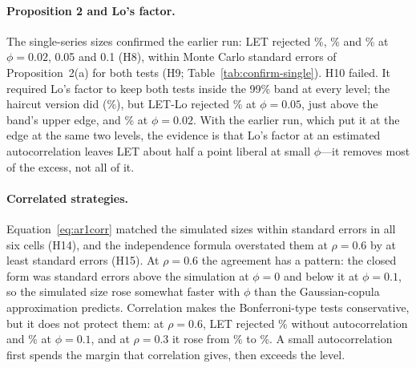 \paragraph{Proposition 2 and Lo's factor.} The single-series sizes confirmed the earlier run: LET rejected \%, \% and \% at $\phi=0.02$, 0.05 and 0.1 (H8), within  Monte Carlo standard errors of Proposition~2(a) for both tests (H9; Table~\ref{tab:confirm-single}). H10 failed. It required Lo's factor to keep both tests inside the 99\% band at every level; the haircut version did (\%), but LET-Lo rejected \% at $\phi=0.05$, just above the band's upper edge, and \% at $\phi=0.02$. With the earlier run, which put it at the edge at the same two levels, the evidence is that Lo's factor at an estimated autocorrelation leaves LET about half a point liberal at small $\phi$---it removes most of the excess, not all of it.

\paragraph{Correlated strategies.} Equation~\eqref{eq:ar1corr} matched the simulated sizes within  standard errors in all six cells (H14), and the independence formula overstated them at $\rho=0.6$ by at least  standard errors (H15). At $\rho=0.6$ the agreement has a pattern: the closed form was  standard errors above the simulation at $\phi=0$ and  below it at $\phi=0.1$, so the simulated size rose somewhat faster with $\phi$ than the Gaussian-copula approximation predicts. Correlation makes the Bonferroni-type tests conservative, but it does not protect them: at $\rho=0.6$, LET rejected \% without autocorrelation and \% at $\phi=0.1$, and at $\rho=0.3$ it rose from \% to \%. A small autocorrelation first spends the margin that correlation gives, then exceeds the level.

